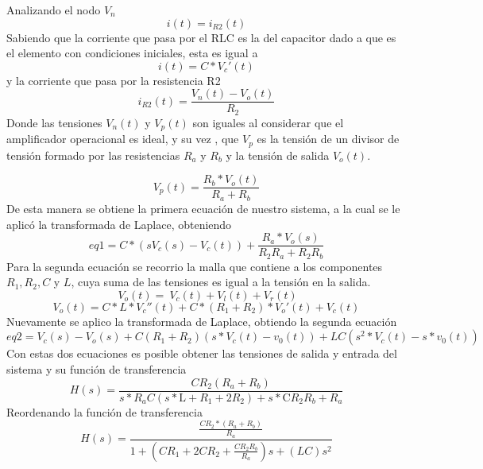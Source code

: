 \documentclass[10pt,a4paper]{article} %
\begin{document}
Analizando el nodo $V_n$
\begin{equation}   
i(t)=i_{R2}(t)
\end{equation}
Sabiendo que la corriente que pasa por el RLC es la del capacitor dado a que es el elemento con condiciones iniciales, esta es igual a 
\begin{equation}
i(t)=C*V_{c}'(t)
\end{equation}
y la corriente que pasa por la resistencia R2 
\begin{equation}
i_{R2}(t)=\frac{V_{n}(t)-V_{o}(t)}{R_{2}}
\end{equation}
Donde las tensiones $V_{n}(t)$ y $V_{p}(t)$ son iguales al considerar que el amplificador operacional es ideal, y su vez , que  $V_{p}$ es la tensión de un divisor de tensión formado por las resistencias $R_{a}$ y $R_{b}$ y la tensión de salida  $V_{o}(t)$. 

\begin{equation}
V_{p}(t)=\frac{R_{b}* V_{o}(t)}{R_{a}+R_{b}}
\end{equation}
De esta manera se obtiene la primera ecuación de nuestro sistema, a la cual se le aplicó la transformada de Laplace, obteniendo 
\begin{equation}
eq1=C* (s V_{c}(s)-V_{c}(t))+\frac{R_{a}* V_{o}(s)}{R_{2} R_{a} +R_{2} R_{b}}
\end{equation}
Para la segunda ecuación se recorrio la malla que contiene a los componentes $R_{1},R_{2}, C$ y $L$, cuya suma de las tensiones es igual a la tensión en la salida. 
\begin{equation}
\ V_{o}(t)=\ V_{c}(t)+ V_{l}(t)+ V_{r}(t)
\end{equation}
\begin{equation}
V_{o}(t)=C*L*V_{c}''(t)+ C*(R_{1}+R_{2})*V_{o}'(t)+V_{c}(t)
\end{equation}
Nuevamente se aplico la transformada de Laplace, obtiendo la segunda ecuación
\begin{equation}
eq2 = V_{c}(s) - V_{o}(s) + C(R_{1} + R_{2})(s*V_{c}(t) - v_{0}(t)) + 
LC(s^{2}*V_{c}(t) - s*v_{0}(t))
\end{equation}
Con estas dos ecuaciones es posible obtener las tensiones de salida y entrada del sistema y su función de transferencia 
\begin{equation}
H(s)=\frac{C R_{2} (R_{a}+R_{b})}{s*R_{a}C (s*\text{L} +R_{1}+2 R_{2})+s*\text{C}R_{2} R_{b} +R_{a}}
\end{equation}
Reordenando la función de transferencia
\begin{equation}
H(s)=\frac{\frac{CR_{2}*(R_{a}+R_{b})}{R_{a}}}{1+(CR_{1}+2CR_{2}+\frac{CR_{2}R_{b}}{R_{a}})s+(LC)s^{2}}
\end{equation}
\\
\end{document}
